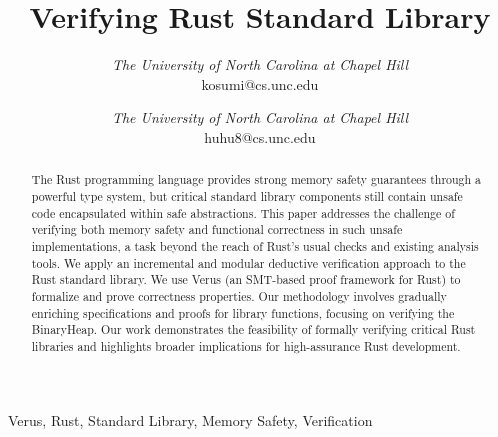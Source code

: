 \documentclass[conference]{IEEEtran}
\begin{document}
\title{Verifying Rust Standard Library}

\author{
\textit{The University of North Carolina at
Chapel Hill}\\
kosumi@cs.unc.edu
\and
{}
\textit{The University of North Carolina at
Chapel Hill}\\
huhu8@cs.unc.edu}
\maketitle


\begin{IEEEkeywords}
Verus, Rust, Standard Library, Memory Safety, Verification 
\end{IEEEkeywords}

\begin{abstract}
The Rust programming language provides strong memory safety guarantees through a powerful type system, but critical standard library components still contain unsafe code encapsulated within safe abstractions. This paper addresses the challenge of verifying both memory safety and functional correctness in such unsafe implementations, a task beyond the reach of Rust’s usual checks and existing analysis tools. We apply an incremental and modular deductive verification approach to the Rust standard library. We use Verus (an SMT-based proof framework for Rust) to formalize and prove correctness properties. Our methodology involves gradually enriching specifications and proofs for library functions, focusing on verifying the BinaryHeap. Our work demonstrates the feasibility of formally verifying critical Rust libraries and highlights broader implications for high-assurance Rust development.
\end{abstract}
\end{document}
